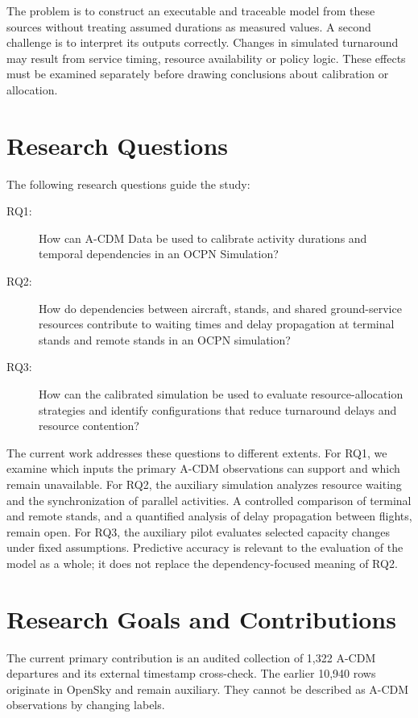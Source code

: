 The problem is to construct an executable and traceable model from these sources without treating assumed durations as measured values. A second challenge is to interpret its outputs correctly. Changes in simulated turnaround may result from service timing, resource availability or policy logic. These effects must be examined separately before drawing conclusions about calibration or allocation.

\section{Research Questions}
The following research questions guide the study:
\begin{description}
\item[RQ1:] How can A-CDM Data be used to calibrate activity durations and temporal dependencies in an OCPN Simulation?
\item[RQ2:] How do dependencies between aircraft, stands, and shared ground-service resources contribute to waiting times and delay propagation at terminal stands and remote stands in an OCPN simulation?
\item[RQ3:] How can the calibrated simulation be used to evaluate resource-allocation strategies and identify configurations that reduce turnaround delays and resource contention?
\end{description}

The current work addresses these questions to different extents. For RQ1, we examine which inputs the primary A-CDM observations can support and which remain unavailable. For RQ2, the auxiliary simulation analyzes resource waiting and the synchronization of parallel activities. A controlled comparison of terminal and remote stands, and a quantified analysis of delay propagation between flights, remain open. For RQ3, the auxiliary pilot evaluates selected capacity changes under fixed assumptions. Predictive accuracy is relevant to the evaluation of the model as a whole; it does not replace the dependency-focused meaning of RQ2.

\section{Research Goals and Contributions}
The current primary contribution is an audited collection of 1,322 A-CDM departures and its external timestamp cross-check. The earlier 10,940 rows originate in OpenSky and remain auxiliary. They cannot be described as A-CDM observations by changing labels.

